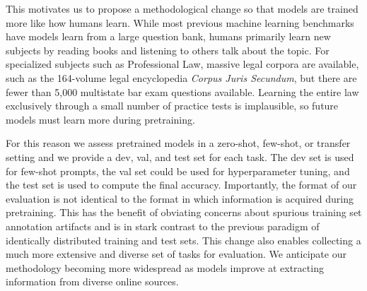 This motivates us to propose a methodological change so that models are trained more like how humans learn.
While most previous machine learning benchmarks have models learn from a large question bank, humans primarily learn new subjects by reading books and listening to others talk about the topic. For specialized subjects such as Professional Law, massive legal corpora are available, such as the 164-volume legal encyclopedia \emph{Corpus Juris Secundum}, but there are fewer than 5,000 multistate bar exam questions available. Learning the entire law exclusively through a small number of practice tests is implausible, so future models must learn more during pretraining. 

For this reason we assess pretrained models in a zero-shot, few-shot, or transfer setting and we provide a dev, val, and test set for each task. The dev set is used for few-shot prompts, the val set could be used for hyperparameter tuning, and the test set is used to compute the final accuracy. Importantly, the format of our evaluation is not identical to the format in which information is acquired during pretraining. This has the benefit of obviating concerns about spurious training set annotation artifacts \citep{geirhos2020shortcut,Hendrycks2019NaturalAE} and is in stark contrast to the previous paradigm of identically distributed training and test sets. 
This change also enables collecting a much more extensive and diverse set of tasks for evaluation.
We anticipate our methodology becoming more widespread as models improve at extracting information from diverse online sources.



